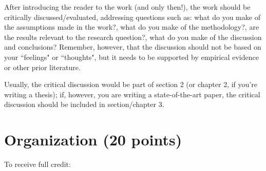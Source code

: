 \documentclass[11pt,fleqn,a4paper/thesis]{article}
\newcommand{\6}{\mbox{$[\hspace*{-.6mm}[$}}
\newcommand{\9}{\mbox{$]\hspace*{-.6mm}]$}}
\begin{document}
\begin{itemize}[itemsep=-1pt,leftmargin=2.5ex,topsep=-2pt]
\begin{enumerate}
\end{enumerate}


After introducing the reader to the work (and only then!), the work should be critically discussed/evaluated, addressing questions such as: what do you make of the assumptions made in the work?, what do you make of the methodology?, are the results relevant to the research question?, what do you make of the discussion and conclusions? Remember, however, that the discussion should not be based on your ``feelings" or ``thoughts", but it needs to be supported by empirical evidence or other prior literature. 

Usually, the critical discussion would be part of section 2 (or chapter 2, if you're writing a thesis); if, however, you are writing a state-of-the-art paper, the critical discussion should be included in section/chapter 3. 

\end{itemize}

\section{Organization (20 points)}

To receive full credit:
\end{document}
